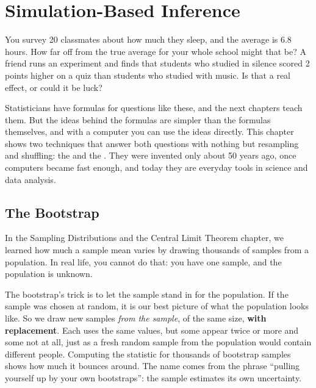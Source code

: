 \chapter{Simulation-Based Inference}

You survey 20 classmates about how much they sleep, and the average is 6.8 hours. How far
off from the true average for your whole school might that be? A friend runs an
experiment and finds that students who studied in silence scored 2 points higher on a quiz
than students who studied with music. Is that a real effect, or could it be luck?

Statisticians have formulas for questions like these, and the next chapters teach them. But
the ideas behind the formulas are simpler than the formulas themselves, and with a computer
you can use the ideas directly. This chapter shows two techniques that answer both
questions with nothing but resampling and shuffling: the  and the
. They were invented only about 50 years ago, once computers became
fast enough, and today they are everyday tools in science and data analysis.

\section{The Bootstrap}
In the Sampling Distributions and the Central Limit Theorem chapter, we learned how much a
sample mean varies by drawing thousands of samples from a population. In real life, you
cannot do that: you have one sample, and the population is unknown.

The bootstrap's trick is to let the sample stand in for the population. If the sample was
chosen at random, it is our best picture of what the population looks like. So we draw new
samples \emph{from the sample}, of the same size, \textbf{with replacement}. Each
 uses the same values, but some appear twice or more and some not
at all, just as a fresh random sample from the population would contain different people.
Computing the statistic for thousands of bootstrap samples shows how much it bounces around.
The name comes from the phrase ``pulling yourself up by your own bootstraps'': the sample
estimates its own uncertainty.

